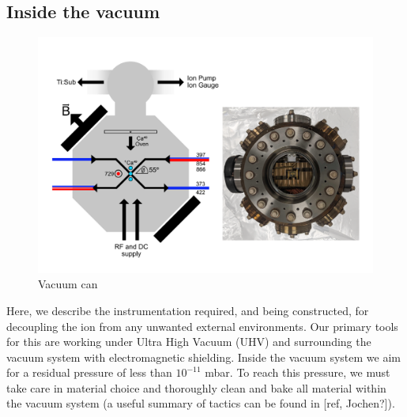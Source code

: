 \documentclass[12pt]{iopart}
\begin{document}


\subsection{Inside the vacuum}

\begin{figure}
  \begin{center}
   \noindent\includegraphics[width=\linewidth]{figures/vacuum_can.pdf}
  \end{center}
  \caption{Vacuum can}
  \label{fig:can}
\end{figure}

Here, we describe the instrumentation required, and being
constructed, for decoupling the ion from any unwanted external
environments. Our primary tools for this are working under Ultra High
Vacuum (UHV) and surrounding the vacuum system with electromagnetic
shielding. Inside the vacuum system we aim for a residual pressure of
less than $10^{-11}$ mbar. To reach this pressure, we must take
care in material choice and thoroughly clean and bake all material
within the vacuum system (a useful summary of tactics can be found in [ref, Jochen?]).
\end{document}
